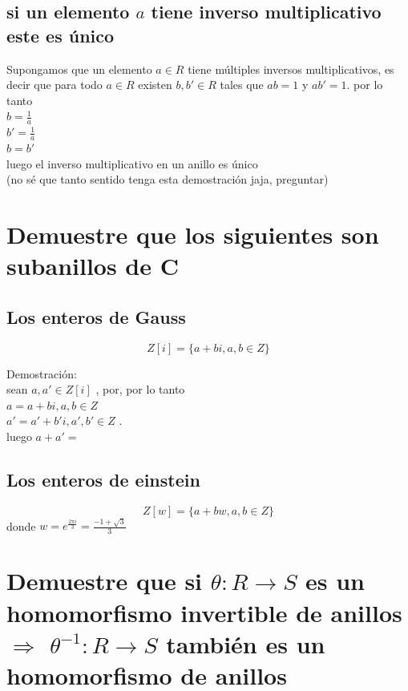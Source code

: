\documentclass[10pt,a4paper]{article} %
\begin{document}
        \subsection{si un elemento $ a  $ tiene inverso multiplicativo este es
        único}
            Supongamos que un elemento $ a \in R  $ tiene múltiples inversos
            multiplicativos,  es decir que para todo $ a \in R  $ existen $ b,
            b' \in R$ tales que $ ab = 1  $ y $ ab' =1 $. por lo tanto
            \\ $ b = \frac{1}{a}  $
            \\ $ b' = \frac{1}{a}  $
            \\ $ b = b'  $
            \\ luego el inverso multiplicativo en un anillo es único
            \\ (no sé que tanto sentido tenga esta demostración jaja, preguntar)

    \section{Demuestre que los siguientes son subanillos de C}
        \subsection{Los enteros de Gauss}
            \begin{equation}
                Z[i] = \{a + bi ,a,b \in Z \}
            \end{equation}

            Demostración:
            \\
            sean $ a,a' \in Z[i]  $ , por, por lo tanto
            \\ $ a = {a+bi , a , b \in Z} $
            \\ $ a' = a' + b'i , a', b' \in Z   $ .
            \\luego $ a + a' =   $

        \subsection{Los enteros de einstein}
        \begin{equation}
                Z[w] = \{a + bw ,a,b \in Z \}
        \end{equation}
        donde $ w = e ^{ \frac{2 \pi i}{3} } = \frac{-1 + \sqrt{3} }{3}  $

    \section{Demuestre que si $ \theta : R \to S  $ es un homomorfismo
    invertible de anillos $ \Rightarrow  $  $ \theta ^{-1} : R \to S  $ también
    es un homomorfismo de anillos}
\end{document}

